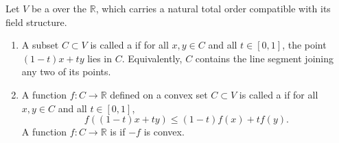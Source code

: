 \begin{definition} \label{definition:convex_set_on_a_real_vector_space_and_convex_function_on_a_convex_set}
Let $V$ be a  over the  $\mathbb{R}$, which carries a natural total order compatible with its field structure.

\begin{enumerate}
    \item A subset $C \subset V$ is called a  if for all $x,y \in C$ and all $t \in [0,1]$, the point $(1-t)x + ty$ lies in $C$. Equivalently, $C$ contains the line segment joining any two of its points.

    \item A function $f : C \to \mathbb{R}$ defined on a convex set $C \subset V$ is called a  if for all $x,y \in C$ and all $t \in [0,1]$,
    $$f((1-t)x + ty) \leq (1-t)f(x) + tf(y).$$
    A function $f : C \to \mathbb{R}$ is  if $-f$ is convex.
\end{enumerate}
\end{definition}
